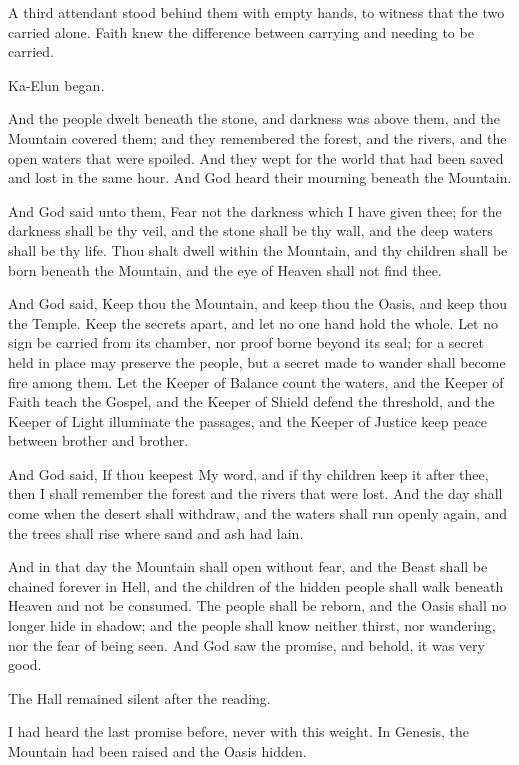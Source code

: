 A third attendant stood behind them with empty hands, to witness that the two carried alone.
Faith knew the difference between carrying and needing to be carried.\par
Ka-Elun began.\par
\begin{scripture}
And the people dwelt beneath the stone, and darkness was above them, and the Mountain covered them; and they remembered the forest, and the rivers, and the open waters that were spoiled.
And they wept for the world that had been saved and lost in the same hour.
And God heard their mourning beneath the Mountain.

And God said unto them, Fear not the darkness which I have given thee; for the darkness shall be thy veil, and the stone shall be thy wall, and the deep waters shall be thy life.
Thou shalt dwell within the Mountain, and thy children shall be born beneath the Mountain, and the eye of Heaven shall not find thee.

And God said, Keep thou the Mountain, and keep thou the Oasis, and keep thou the Temple.
Keep the secrets apart, and let no one hand hold the whole.
Let no sign be carried from its chamber, nor proof borne beyond its seal; for a secret held in place may preserve the people, but a secret made to wander shall become fire among them.
Let the Keeper of Balance count the waters, and the Keeper of Faith teach the Gospel, and the Keeper of Shield defend the threshold, and the Keeper of Light illuminate the passages, and the Keeper of Justice keep peace between brother and brother.

And God said, If thou keepest My word, and if thy children keep it after thee, then I shall remember the forest and the rivers that were lost.
And the day shall come when the desert shall withdraw, and the waters shall run openly again, and the trees shall rise where sand and ash had lain.

And in that day the Mountain shall open without fear, and the Beast shall be chained forever in Hell, and the children of the hidden people shall walk beneath Heaven and not be consumed.
The people shall be reborn, and the Oasis shall no longer hide in shadow; and the people shall know neither thirst, nor wandering, nor the fear of being seen.
And God saw the promise, and behold, it was very good.
\end{scripture}
The Hall remained silent after the reading.\par
I had heard the last promise before, never with this weight.
In Genesis, the Mountain had been raised and the Oasis hidden.
